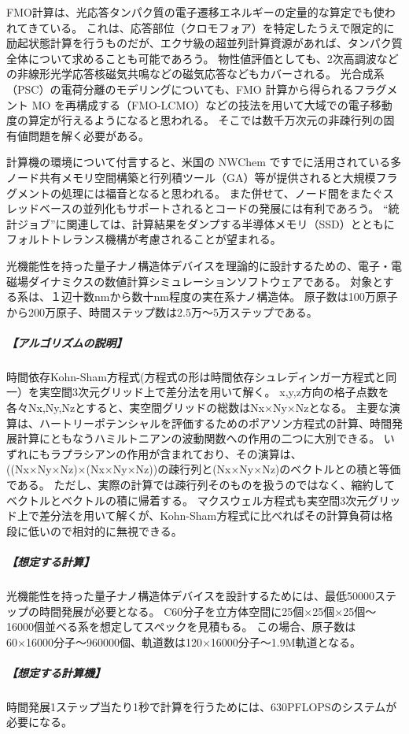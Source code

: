 FMO計算は、光応答タンパク質の電子遷移エネルギーの定量的な算定でも使われてきている。
これは、応答部位（クロモフォア）を特定したうえで限定的に励起状態計算を行うものだが、エクサ級の超並列計算資源があれば、タンパク質全体について求めることも可能であろう。
物性値評価としても、2次高調波などの非線形光学応答核磁気共鳴などの磁気応答などもカバーされる。
光合成系（PSC）の電荷分離のモデリングについても、FMO 計算から得られるフラグメント MO を再構成する（FMO-LCMO）などの技法を用いて大域での電子移動度の算定が行えるようになると思われる。
そこでは数千万次元の非疎行列の固有値問題を解く必要がある。

計算機の環境について付言すると、米国の NWChem ですでに活用されている多ノード共有メモリ空間構築と行列積ツール（GA）等が提供されると大規模フラグメントの処理には福音となると思われる。
また併せて、ノード間をまたぐスレッドベースの並列化もサポートされるとコードの発展には有利であろう。
“統計ジョブ”に関連しては、計算結果をダンプする半導体メモリ（SSD）とともにフォルトトレランス機構が考慮されることが望まれる。


\label{sec:4-2_要求性能_電子電磁場}
光機能性を持った量子ナノ構造体デバイスを理論的に設計するための、電子・電磁場ダイナミクスの数値計算シミュレーションソフトウェアである。
対象とする系は、１辺十数nmから数十nm程度の実在系ナノ構造体。
原子数は100万原子から200万原子、時間ステップ数は2.5万～5万ステップである。

\subparagraph{【アルゴリズムの説明】}
時間依存Kohn-Sham方程式(方程式の形は時間依存シュレディンガー方程式と同一）を実空間3次元グリッド上で差分法を用いて解く。
x,y,z方向の格子点数を各々Nx,Ny,Nzとすると、実空間グリッドの総数はNx×Ny×Nzとなる。
主要な演算は、ハートリーポテンシャルを評価するためのポアソン方程式の計算、時間発展計算にともなうハミルトニアンの波動関数への作用の二つに大別できる。
いずれにもラプラシアンの作用が含まれており、その演算は、((Nx×Ny×Nz)×(Nx×Ny×Nz))の疎行列と(Nx×Ny×Nz)のベクトルとの積と等価である。
ただし、実際の計算では疎行列そのものを扱うのではなく、縮約してベクトルとベクトルの積に帰着する。
マクスウェル方程式も実空間3次元グリッド上で差分法を用いて解くが、Kohn-Sham方程式に比べればその計算負荷は格段に低いので相対的に無視できる。

\subparagraph{【想定する計算】}
光機能性を持った量子ナノ構造体デバイスを設計するためには、最低50000ステップの時間発展が必要となる。
C60分子を立方体空間に25個×25個×25個～16000個並べる系を想定してスペックを見積もる。
この場合、原子数は60×16000分子～960000個、軌道数は120×16000分子～1.9M軌道となる。

\subparagraph{【想定する計算機】}
時間発展1ステップ当たり1秒で計算を行うためには、630PFLOPSのシステムが必要になる。

